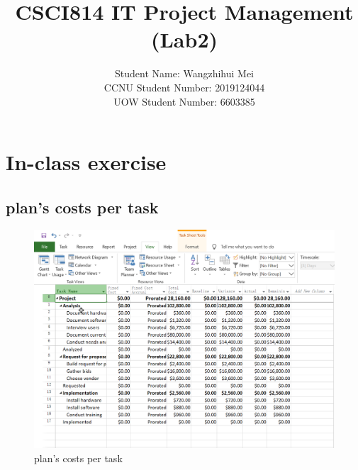 \documentclass[runningheads]{llncs}
\begin{document}
\title{\large{CSCI814 IT Project Management (Lab2)}}

%
%
\author{\large{Student Name: Wangzhihui Mei \\ %
        CCNU Student Number: 2019124044 \\ %
        UOW Student Number: 6603385}}  %







\maketitle
\clearpage


\section{In-class exercise}
\subsection{plan's costs per task}
\begin{figure}[H]
    \centering
    \includegraphics[width=1.0\textwidth]{./image/figure1}
    \caption{plan's costs per task}
    \label{}
\end{figure}
\end{document}
